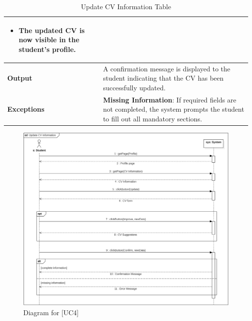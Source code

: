 \begin{table}[H]
\begin{tabular}{|p{4cm}|p{11cm}|}
{\begin{itemize}
        \item The updated CV is now visible in the student's profile.
    \end{itemize}} \\ \hline
    \textbf{Output} & 
    A confirmation message is displayed to the student indicating that the CV has been successfully updated. \\ \hline
    \textbf{Exceptions} & 
    \textbf{Missing Information}: If required fields are not completed, the system prompts the student to fill out all mandatory sections. \\ \hline
    \end{tabular}
    \caption{Update CV Information Table}
\end{table}

\begin{figure} [H]
    \centering
    \includegraphics[width=1\linewidth]{Use Cases Images/update_CV_informations.png}
    \caption{Diagram for [UC4]}
    \label{fig: Update CV Information Diagram}
\end{figure}

